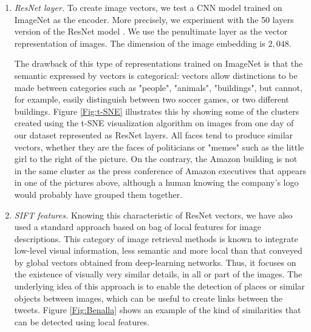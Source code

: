 \begin{enumerate}
    \item{\textit{ResNet layer.}} To create image vectors, we test a CNN model trained on ImageNet as the encoder. More precisely, we experiment with the 50 layers version of the ResNet model \citep{he2016deep}. We use the penultimate layer as the vector representation of images. The dimension of the image embedding is $2,048$.
    
    The drawback of this type of representations trained on ImageNet is that the semantic expressed by vectors is categorical: vectors allow distinctions to be made between categories such as "people", "animals", "buildings", but cannot, for example, easily distinguish between two soccer games, or two different buildings. Figure \ref{Fig:t-SNE} illustrates this by showing some of the clusters created using the t-SNE visualization algorithm  \cite{maaten2008visualizing} on images from one day of our dataset represented as ResNet layers. All faces tend to produce similar vectors, whether they are the faces of politicians or "memes" such as the little girl to the right of the picture. On the contrary, the Amazon building is not in the same cluster as the press conference of Amazon executives that appears in one of the pictures above, although a human knowing the company's logo would probably have grouped them together.
    
    \item{\textit{SIFT features.}} Knowing this characteristic of ResNet vectors, we have also used a standard approach based on bag of local features for image descriptions. This category of image retrieval methods is known to integrate low-level visual information, less semantic and more local than that conveyed by global vectors obtained from deep-learning networks. Thus, it focuses on the existence of visually very similar details, in all or part of the images. The underlying idea of this approach is to enable the detection of places or similar objects between images, which can be useful to create links between the tweets. Figure \ref{Fig:Benalla} shows an example of the kind of similarities that can be detected using local features.
    

\end{enumerate}
